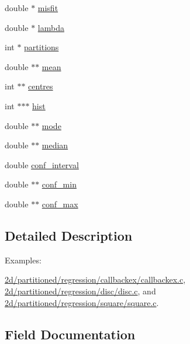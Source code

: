 \begin{DoxyCompactItemize}
\item 
double $\ast$ \hyperlink{struct__resultset2d_a032409aaede183d9c6954ee4ea7d1271}{misfit}
\item 
double $\ast$ \hyperlink{struct__resultset2d_a19dd297dae229caefc82c40f7204d126}{lambda}
\item 
int $\ast$ \hyperlink{struct__resultset2d_a7e653d18c276f644dd5466a812818cf2}{partitions}
\item 
double $\ast$$\ast$ \hyperlink{struct__resultset2d_a681bb42e2518e953b71e899bade3af95}{mean}
\item 
int $\ast$$\ast$ \hyperlink{struct__resultset2d_ad868e1040ec7cd4ebde3076af182bed9}{centres}
\item 
int $\ast$$\ast$$\ast$ \hyperlink{struct__resultset2d_a85cf09d081611db8511999e6fb58b6f4}{hist}
\item 
double $\ast$$\ast$ \hyperlink{struct__resultset2d_a9621b34dfac4929e8fa146be94c19e46}{mode}
\item 
double $\ast$$\ast$ \hyperlink{struct__resultset2d_aace30f7a8061365973da8a7bd37628c7}{median}
\item 
double \hyperlink{struct__resultset2d_af9cfa75a5bd9c971b73c4a696743486b}{conf\+\_\+interval}
\item 
double $\ast$$\ast$ \hyperlink{struct__resultset2d_a9dbd7a46c112941fe6f0af73d89782f7}{conf\+\_\+min}
\item 
double $\ast$$\ast$ \hyperlink{struct__resultset2d_ad6c112f35d38a3b7e2f5facee0856513}{conf\+\_\+max}
\end{DoxyCompactItemize}


\subsection{Detailed Description}
\begin{Desc}
\item[Examples\+: ]\par
\hyperlink{2d_2partitioned_2regression_2callbackex_2callbackex_8c-example}{2d/partitioned/regression/callbackex/callbackex.\+c}, \hyperlink{2d_2partitioned_2regression_2disc_2disc_8c-example}{2d/partitioned/regression/disc/disc.\+c}, and \hyperlink{2d_2partitioned_2regression_2square_2square_8c-example}{2d/partitioned/regression/square/square.\+c}.\end{Desc}


\subsection{Field Documentation}
